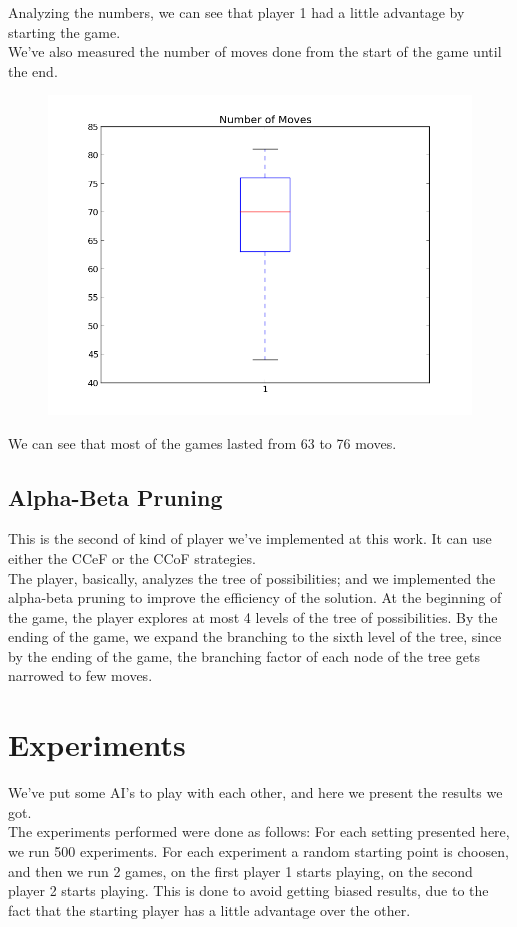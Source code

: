 \documentclass[10pt]{article}
\begin{document}
Analyzing the numbers, we can see that player 1 had a little advantage by starting the game.\\
We've also measured the number of moves done from the start of the game until the end.

\begin{figure}[H]
\centering
\includegraphics[scale=0.35]{img/n_moves_random.png}
\end{figure}

We can see that most of the games lasted from 63 to 76 moves.


\subsection{Alpha-Beta Pruning}
This is the second of kind of player we've implemented at this work. It can use either the CCeF or the CCoF strategies.\\
The player, basically, analyzes the tree of possibilities; and we implemented the alpha-beta pruning to improve the efficiency of the solution. At the beginning of the game, the player explores at most 4 levels of the tree of possibilities. By the ending of the game, we expand the branching to the sixth level of the tree, since by the ending of the game, the branching factor of each node of the tree gets narrowed to few moves.

\section{Experiments}

We've put some AI's to play with each other, and here we present the results we got.\\
The experiments performed were done as follows: For each setting presented here, we run 500 experiments. For each experiment a random starting point is choosen, and then we run 2 games, on the first player 1 starts playing, on the second player 2 starts playing. This is done to avoid getting biased results, due to the fact that the starting player has a little advantage over the other.
\end{document}

